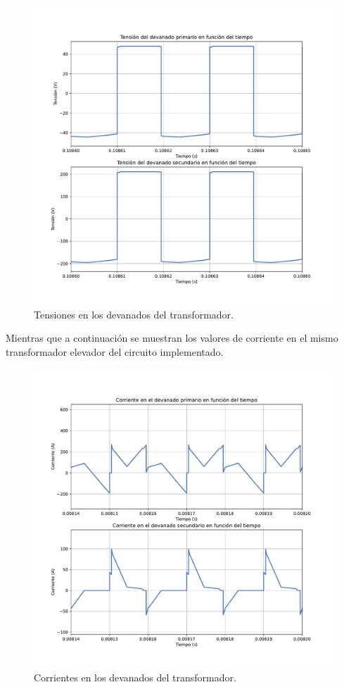 \begin{figure}
	\centering
	\includegraphics[width=1\linewidth]{../../tensiones_transformador}
	\caption{Tensiones en los devanados del transformador.}
	\label{fig:tensionestransformador}
\end{figure}

Mientras que a continuación se muestran los valores de corriente en el mismo transformador elevador del circuito implementado.

\begin{figure}
	\centering
	\includegraphics[width=1\linewidth]{../../corrientes_transformador}
	\caption{Corrientes en los devanados del transformador.}
	\label{fig:corrientestransformador}
\end{figure}


